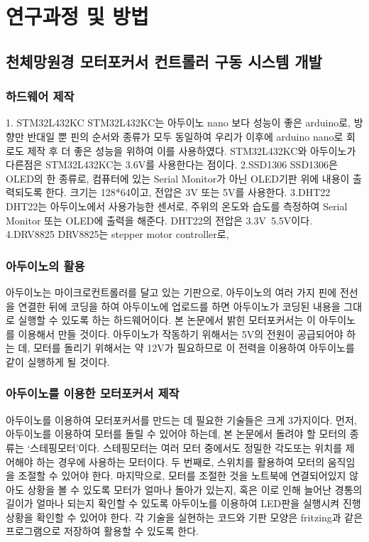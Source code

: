 \section{연구과정 및 방법}



\subsection{천체망원경 모터포커서 컨트롤러 구동 시스템 개발}



\subsubsection{하드웨어 제작}


1. STM32L432KC STM32L432KC는 아두이노 nano 보다 성능이 좋은 arduino로, 방향만 반대일 뿐 핀의 순서와 종류가 모두 동일하여 우리가 이후에 arduino nano로 회로도 제작 후 더 좋은 성능을 위하여 이를 사용하였다. STM32L432KC와 아두이노가 다른점은 STM32L432KC는 3.6V를 사용한다는 점이다.
2.SSD1306 SSD1306은 OLED의 한 종류로, 컴퓨터에 있는 Serial Monitor가 아닌 OLED기판 위에 내용이 출력되도록 한다. 크기는 128*64이고, 전압은 3V 또는 5V를 사용한다.
3.DHT22 DHT22는 아두이노에서 사용가능한 센서로, 주위의 온도와 습도를 측정하여 Serial Monitor 또는 OLED에 출력을 해준다. DHT22의 전압은 3.3V~5.5V이다.
4.DRV8825 DRV8825는 stepper motor controller로, 


\subsubsection{아두이노의 활용}



아두이노는 마이크로컨트롤러를 달고 있는 기판으로, 아두이노의 여러 가지 핀에 전선을 연결한 뒤에 코딩을 하여 아두이노에 업로드를 하면 아두이노가 코딩된 내용을 그대로 실행할 수 있도록 하는 하드웨어이다. 본 논문에서 밝힌 모터포커서는 이 아두이노를 이용해서 만들 것이다. 아두이노가 작동하기 위해서는 5V의 전원이 공급되어야 하는 데, 모터를 돌리기 위해서는 약 12V가 필요하므로 이 전력을 이용하여 아두이노를 같이 실행하게 될 것이다.



\subsubsection{아두이노를 이용한 모터포커서 제작}



아두이노를 이용하여 모터포커서를 만드는 데 필요한 기술들은 크게 3가지이다. 먼저, 아두이노를 이용하여 모터를 돌릴 수 있어야 하는데, 본 논문에서 돌려야 할 모터의 종류는 ‘스테핑모터’이다. 스테핑모터는 여러 모터 중에서도 정밀한 각도또는 위치를 제어해야 하는 경우에 사용하는 모터이다. 두 번째로, 스위치를 활용하여 모터의 움직임을 조절할 수 있어야 한다. 마지막으로, 모터를 조절한 것을 노트북에 연결되어있지 않아도 상황을 볼 수 있도록 모터가 얼마나 돌아가 있는지, 혹은 이로 인해 늘어난 경통의 길이가 얼마나 되는지 확인할 수 있도록 아두이노를 이용하여 LED판을 실행시켜 진행 상황을 확인할 수 있어야 한다. 각 기술을 실현하는 코드와 기판 모양은 fritzing과 같은 프로그램으로 저장하여 활용할 수 있도록 한다.

